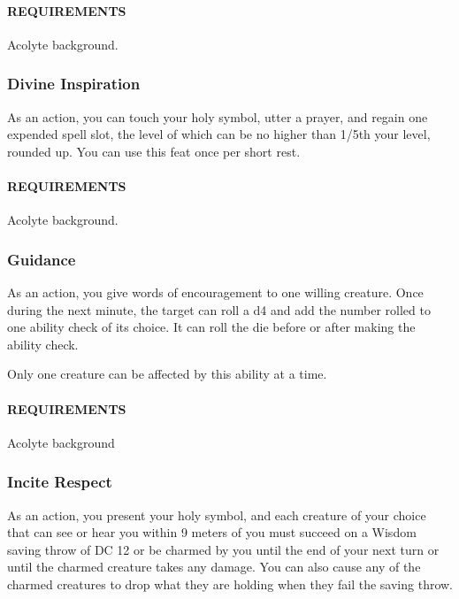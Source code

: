         \paragraph{REQUIREMENTS} Acolyte background.

    \subsubsection{Divine Inspiration} \label{feat::divineinspiration}
        As an action, you can touch your holy symbol, utter a prayer, and regain one expended spell slot, the level of which can be no higher than 1/5th your level, rounded up.
        You can use this feat once per short rest.
        \paragraph{REQUIREMENTS} Acolyte background.

    \subsubsection{Guidance} \label{feat::guidance}
        As an action, you give words of encouragement to one willing creature.
        Once during the next minute, the target can roll a d4 and add the number rolled to one ability check of its choice.
        It can roll the die before or after making the ability check.

        Only one creature can be affected by this ability at a time.
        \paragraph{REQUIREMENTS} Acolyte background

    \subsubsection{Incite Respect} \label{feat::inciterespect}
        As an action, you present your holy symbol, and each creature of your choice that can see or hear you within 9 meters of you must succeed on a Wisdom saving throw of DC 12 or be charmed by you until the end of your next turn or until the charmed creature takes any damage.
        You can also cause any of the charmed creatures to drop what they are holding when they fail the saving throw.

